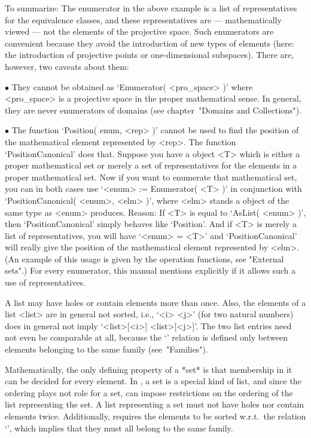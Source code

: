To   summarize: The  enumerator in   the  above  example   is a  list  of
representatives  for the  equivalence  classes, and these representatives
are ---  mathematically  viewed ---  not the  elements  of the projective
space.    Such enumerators   are  convenient  because     they avoid  the
introduction   of  new types  of  elements    (here: the introduction  of
projective points or one-dimensional  subspaces). There are, however, two
caveats about them:
\beginlist
  \item{$\bullet$} They cannot be obtained as `Enumerator( <pro_space> )'
    where  <pro_space> is a projective  space in  the proper mathematical
    sense.   In general, they   are   never enumerators  of domains  (see
    chapter~"Domains and Collections").
  \item{$\bullet$} The function `Position( enum,  <rep> )' cannot be used
    to  find  the position   of  the mathematical  element represented by
    <rep>. The function `PositionCanonical' does that.
\endlist
Suppose  you  have   a   {\GAP} object  <T>  which  is   either  a proper
mathematical set or merely a set of representatives for the elements in a
proper  mathematical set. Now if  you want to enumerate that mathematical
set,   you  can in  both  cases  use  `<enum> :=  Enumerator(  <T>  )' in
conjunction with `PositionCanonical( <enum>, <elm> )', where <elm> stands
a {\GAP} object of  the same type as  <enum> produces. Reason: If <T>  is
equal to `AsList( <enum> )', then `PositionCanonical' simply behaves like
`Position'. And if <T> is merely a list of representatives, you will have
`<enum> = <T>' and `PositionCanonical'  will really give the position  of
the mathematical element represented by <elm>. (An  example of this usage
is  given by the operation  functions,  see  "External sets".) For  every
enumerator, this manual  mentions explicitly if  it allows such a  use of
representatives.


A  list may  have holes or  contain elements  more  than once. Also,  the
elements of a list <list> are in  general not sorted,  i.e., `<i> \< <j>'
(for    two natural numbers) does  in   general not imply `<list>[<i>] \<
<list>[<j>]'. The  two list entries need  not even  be comparable at all,
because the  `\<' relation is  defined only between elements belonging to
the same family (see~"Families").

Mathematically, the only defining property of  a *set* is that membership
in it  can be decided  for every element. In {\GAP},  a set is  a special
kind of list, and since the ordering plays not role for a set, {\GAP} can
impose restrictions on the  ordering of the list  representing the set. A
list representing a  set must not have holes  nor contain elements twice.
Additionally,  {\GAP} requires the    elements to be sorted   w.r.t.\ the
relation  `\<',  which  implies that  they  must  all belong  to the same
family.

